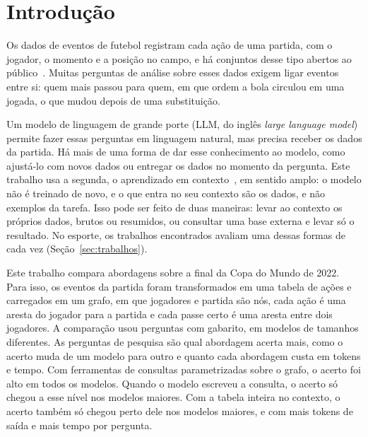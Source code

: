 %

\section{Introdução}\label{sec:introdução}

Os dados de eventos de futebol registram cada ação de uma partida, com o jogador, o momento e a posição no
campo, e há conjuntos desse tipo abertos ao público~\cite{pappalardo2019public}. Muitas perguntas de análise
sobre esses dados exigem ligar eventos entre si: quem mais passou para quem, em que ordem a bola circulou em uma
jogada, o que mudou depois de uma substituição.

Um modelo de linguagem de grande porte (LLM, do inglês \textit{large language model}) permite fazer essas perguntas
em linguagem natural, mas precisa receber os dados da partida. Há mais de uma forma de dar esse conhecimento ao
modelo, como ajustá-lo com novos dados ou entregar os dados no momento da pergunta. Este trabalho usa a segunda, o
aprendizado em contexto~\cite{brown2020language}, em sentido amplo: o modelo não é treinado de novo, e o que entra
no seu contexto são os dados, e não exemplos da tarefa. Isso pode ser feito de duas maneiras: levar ao contexto os
próprios dados, brutos ou resumidos, ou consultar uma base externa e levar só o resultado. No esporte, os trabalhos
encontrados avaliam uma dessas formas de cada vez (Seção~\ref{sec:trabalhos}).

Este trabalho compara \nArms{} abordagens sobre a final da Copa do Mundo de 2022. Para isso, os eventos da partida
foram transformados em uma tabela de ações e carregados em um grafo, em que jogadores e partida são nós, cada ação %
é uma aresta do jogador para a partida e cada passe certo é uma aresta entre dois jogadores. A comparação usou \nQuestions{} perguntas com gabarito, em \nModels{} modelos de tamanhos diferentes. As
perguntas de pesquisa são qual abordagem acerta mais, como o acerto muda de um modelo para outro e quanto cada
abordagem custa em tokens e tempo. Com ferramentas de consultas parametrizadas sobre o grafo, o acerto foi alto em
todos os modelos. Quando o modelo escreveu a consulta, o acerto só chegou a esse nível nos modelos maiores. Com a tabela inteira no contexto, o acerto também só chegou perto dele nos modelos maiores, e com mais tokens de saída e mais tempo por pergunta.
